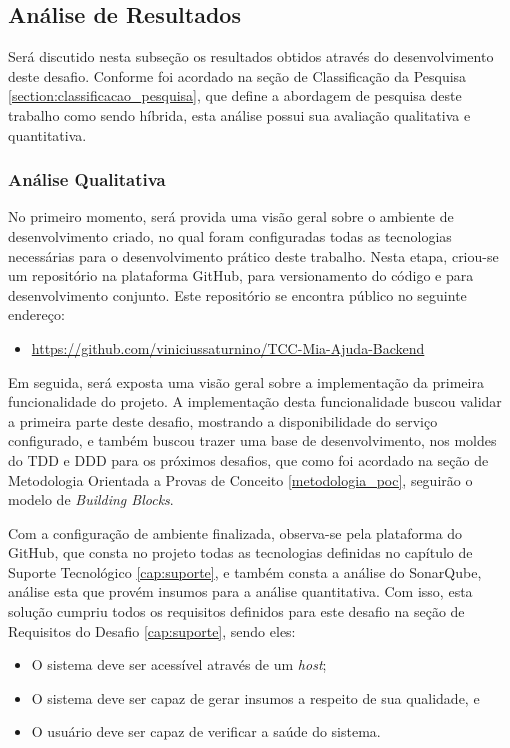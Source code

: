 \subsection{Análise de Resultados}
\label{subsection:analise_resultados}

Será discutido nesta subseção os resultados obtidos através do desenvolvimento deste desafio. 
Conforme foi acordado na seção de Classificação da Pesquisa \ref{section:classificacao_pesquisa}, que define a 
abordagem de pesquisa deste trabalho como sendo híbrida, esta análise possui sua 
avaliação qualitativa e quantitativa.

\subsubsection{Análise Qualitativa}

No primeiro momento, será provida uma visão geral sobre o ambiente de desenvolvimento criado, 
no qual foram configuradas todas as tecnologias necessárias para o 
desenvolvimento prático deste trabalho. Nesta etapa, criou-se um repositório 
na plataforma GitHub, para versionamento do código e para desenvolvimento 
conjunto. Este repositório se encontra público no seguinte endereço:

\begin{itemize}
  \item\url{https://github.com/viniciussaturnino/TCC-Mia-Ajuda-Backend}
\end{itemize}

Em seguida, será exposta uma visão geral sobre a implementação da primeira funcionalidade do projeto. 
A implementação desta funcionalidade buscou validar a primeira parte deste desafio, 
mostrando a disponibilidade do serviço configurado, e também buscou trazer uma base 
de desenvolvimento, nos moldes do TDD e DDD para os próximos desafios, que como foi 
acordado na seção de Metodologia Orientada a Provas de Conceito \ref{metodologia_poc}, seguirão o 
modelo de \textit{Building Blocks}.

Com a configuração de ambiente finalizada, observa-se pela plataforma do GitHub, que consta no projeto 
todas as tecnologias definidas no capítulo de Suporte Tecnológico \ref{cap:suporte}, e também consta a análise do 
SonarQube, análise esta que provém insumos para a análise quantitativa. Com isso, esta solução cumpriu 
todos os requisitos definidos para este desafio na seção de Requisitos do Desafio \ref{cap:suporte}, sendo eles:

\begin{itemize}
  \item O sistema deve ser acessível através de um \textit{host};
  \item O sistema deve ser capaz de gerar insumos a respeito de sua qualidade, e
  \item O usuário deve ser capaz de verificar a saúde do sistema.
\end{itemize}

